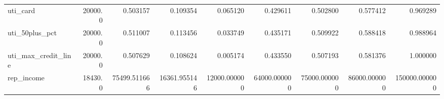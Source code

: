 \begin{tabular}{lrrrrrrrr}
uti\_card                           &  20000.0 &      0.503157 &      0.109354 &      0.065120 &      0.429611 &      0.502800 &       0.577412 &       0.969289 \\
uti\_50plus\_pct                     &  20000.0 &      0.511007 &      0.113456 &      0.033749 &      0.435171 &      0.509922 &       0.588418 &       0.988964 \\
uti\_max\_credit\_line                &  20000.0 &      0.507629 &      0.108624 &      0.005174 &      0.433550 &      0.507193 &       0.581376 &       1.000000 \\
rep\_income                         &  18430.0 &  75499.511666 &  16361.955146 &  12000.000000 &  64000.000000 &  75000.000000 &   86000.000000 &  150000.000000 \\
\bottomrule
\end{tabular}
